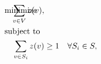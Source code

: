 \begin{align}
    & \underset{}{\text{minimize}}\hspace{-2cm} 
    & \sum_{\vertex\in\vertices} \switch(\vertex),& &
    \label{ch:facts:lp:hitting-set:eq:objective}
    \\
    & \text{subject to}\hspace{-3cm}& &
    \nonumber
    \\%
    &&\sum_{\vertex\in S_i} \switch(\vertex) &\geq 1
    &\forall S_i\in S,
    \label{ch:facts:lp:hitting-set:eq:hitting-set-constraint}
\end{align}